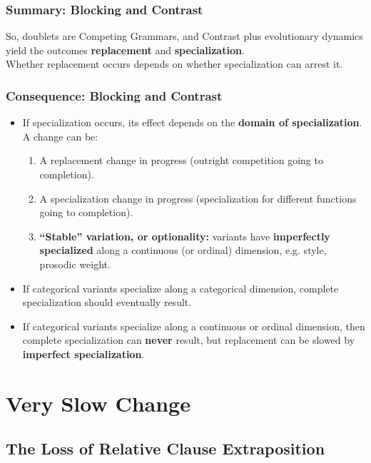 \documentclass[hyperref={pdfpagelabels=false}]{beamer}
\begin{document}
\begin{frame}
\frametitle{Summary: Blocking and Contrast}
So, doublets are Competing Grammars, and Contrast plus evolutionary dynamics yield the outcomes \textbf{replacement} and \textbf{specialization}.\\
\vspace*{10mm}
Whether replacement occurs depends on whether specialization can arrest it.

\end{frame}


\begin{frame}
\frametitle{Consequence: Blocking and Contrast}
\begin{itemize}
	\item If specialization occurs, its effect depends on the \textbf{domain of specialization}. A change can be:
		\begin{enumerate}
			\item A replacement change in progress (outright competition going to completion).
			\item A specialization change in progress (specialization for different functions going to completion).
			\item \textbf{``Stable'' variation, or optionality:} variants have \textbf{imperfectly specialized} along a continuous (or ordinal) dimension, e.g. style, prosodic weight. 
		\end{enumerate}
	\item If categorical variants specialize along a categorical dimension, complete specialization should eventually result.
	\item If categorical variants specialize along a continuous or ordinal dimension, then complete specialization can \textbf{never} result, but replacement can be slowed by \textbf{imperfect specialization}.
\end{itemize}

\end{frame}



\section{Very Slow Change}
\subsection{The Loss of Relative Clause Extraposition}
\end{document}
